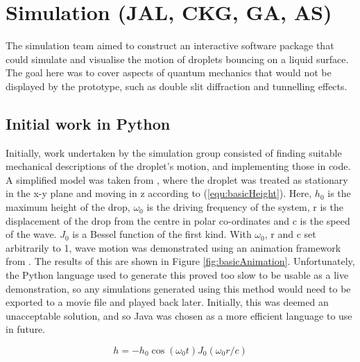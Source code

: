 \section{Simulation (JAL, CKG, GA, AS)}
The simulation team aimed to construct an interactive software package that could simulate and visualise the motion of droplets bouncing on a liquid surface. The goal here was to cover aspects of quantum mechanics that would not be displayed by the prototype, such as double slit diffraction and tunnelling effects.
\subsection{Initial work in Python}
Initially, work undertaken by the simulation group consisted of finding suitable mechanical descriptions of the droplet's motion, and implementing those in code. A simplified model was taken from \cite{brady2014bouncing}, where the droplet was treated as stationary in the x-y plane and moving in z according to (\ref{equ:basicHeight}). Here, $h_0$ is the maximum height of the drop, $\omega_0$ is the driving frequency of the system, r is the displacement of the drop from the centre in polar co-ordinates and c is the speed of the wave. $J_0$ is a Bessel function of the first kind. With $\omega_0$, r and c set arbitrarily to 1, wave motion was demonstrated using an animation framework from \cite{waveanimation}. The results of this are shown in Figure \ref{fig:basicAnimation}. Unfortunately, the Python language used to generate this proved too slow to be usable as a live demonstration, so any simulations generated using this method would need to be exported to a movie file and played back later. Initially, this was deemed an unacceptable solution, and so Java was chosen as a more efficient language to use in future.

\begin{equation}
    h = -h_0 \cos{(\omega_0 t)} J_0 (\omega_0 r/c)
    \label{equ:basicHeight}
\end{equation}

